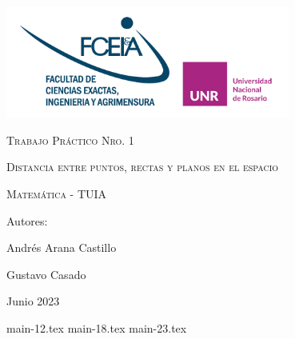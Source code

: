 \documentclass[a4paper,12pt]{article}
\begin{document}
\begin{titlepage}
	\centering
	\vspace{1cm}
	{\includegraphics[width=0.7\textwidth]{FCEIA-logo.png}\par}
	\vspace{2cm}
	{\scshape\Huge Trabajo Práctico Nro. 1 \par}
	\vspace{1cm}
	{\scshape\Large Distancia entre puntos, rectas y planos en el espacio \par}
	\vspace{3cm}
	{\scshape\Large Matemática - TUIA \par}
	\vfill
	{\Large Autores: \par}
	{\Large Andrés Arana Castillo \par}
	{\Large Gustavo Casado \par}
	\vfill
	{\Large Junio 2023 \par}
\end{titlepage}

\tableofcontents

{main-12.tex}
{main-18.tex}
{main-23.tex}
\end{document}
